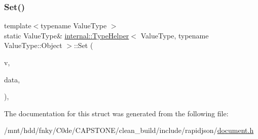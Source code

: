 \subsubsection{\texorpdfstring{Set()}{Set()}\hspace{0.1cm}{\footnotesize\ttfamily [2/2]}}
{\footnotesize\ttfamily template$<$typename Value\+Type $>$ \\
static Value\+Type\& \hyperlink{structinternal_1_1TypeHelper}{internal\+::\+Type\+Helper}$<$ Value\+Type, typename Value\+Type\+::\+Object $>$\+::Set (\begin{DoxyParamCaption}\item[{Value\+Type \&}]{v,  }\item[{\hyperlink{structinternal_1_1TypeHelper_3_01ValueType_00_01typename_01ValueType_1_1Object_01_4_ac5d59bffe76792786fd5f1ba4da94dd9}{Object\+Type}}]{data,  }\item[{typename Value\+Type\+::\+Allocator\+Type \&}]{ }\end{DoxyParamCaption})\hspace{0.3cm}{\ttfamily [inline]}, {\ttfamily [static]}}



The documentation for this struct was generated from the following file\+:\begin{DoxyCompactItemize}
\item 
/mnt/hdd/fnky/\+C0de/\+C\+A\+P\+S\+T\+O\+N\+E/clean\+\_\+build/include/rapidjson/\hyperlink{document_8h}{document.\+h}\end{DoxyCompactItemize}
